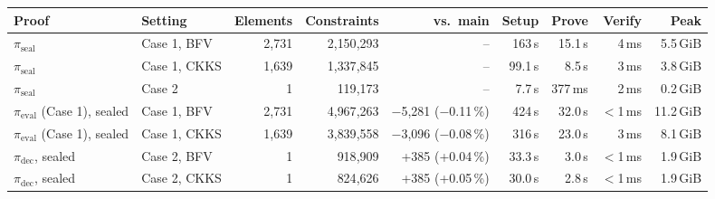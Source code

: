 \begin{tabular}{llrrrrrrr}
\toprule
Proof & Setting & Elements & Constraints & vs.\ main & Setup & Prove & Verify & Peak \\
\midrule
$\pi_{\text{seal}}$ & Case 1, BFV & 2{,}731 & 2{,}150{,}293 & -- & 163\,s & 15.1\,s & 4\,ms & 5.5\,GiB \\
$\pi_{\text{seal}}$ & Case 1, CKKS & 1{,}639 & 1{,}337{,}845 & -- & 99.1\,s & 8.5\,s & 3\,ms & 3.8\,GiB \\
$\pi_{\text{seal}}$ & Case 2 & 1 & 119{,}173 & -- & 7.7\,s & 377\,ms & 2\,ms & 0.2\,GiB \\
$\pi_{\text{eval}}$ (Case 1), sealed & Case 1, BFV & 2{,}731 & 4{,}967{,}263 & $-$5{,}281 ($-$0.11\,\%) & 424\,s & 32.0\,s & $<$1\,ms & 11.2\,GiB \\
$\pi_{\text{eval}}$ (Case 1), sealed & Case 1, CKKS & 1{,}639 & 3{,}839{,}558 & $-$3{,}096 ($-$0.08\,\%) & 316\,s & 23.0\,s & 3\,ms & 8.1\,GiB \\
$\pi_{\text{dec}}$, sealed & Case 2, BFV & 1 & 918{,}909 & +385 (+0.04\,\%) & 33.3\,s & 3.0\,s & $<$1\,ms & 1.9\,GiB \\
$\pi_{\text{dec}}$, sealed & Case 2, CKKS & 1 & 824{,}626 & +385 (+0.05\,\%) & 30.0\,s & 2.8\,s & $<$1\,ms & 1.9\,GiB \\
\bottomrule
\end{tabular}
